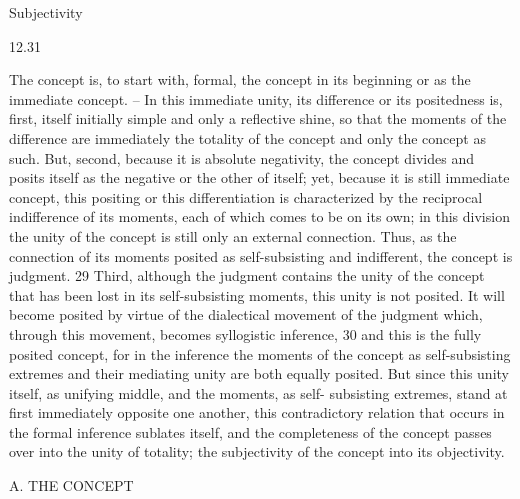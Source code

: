 
Subjectivity

12.31

The concept is, to start with, formal, the concept in its beginning or as
the immediate concept. – In this immediate unity, its difference or its
positedness is, first, itself initially simple and only a reflective shine, so that
the moments of the difference are immediately the totality of the concept
and only the concept as such.
But, second, because it is absolute negativity, the concept divides and
posits itself as the negative or the other of itself; yet, because it is still
immediate concept, this positing or this differentiation is characterized by
the reciprocal indifference of its moments, each of which comes to be on
its own; in this division the unity of the concept is still only an external
connection. Thus, as the connection of its moments posited as self-subsisting
and indifferent, the concept is judgment. 29
Third, although the judgment contains the unity of the concept that
has been lost in its self-subsisting moments, this unity is not posited. It
will become posited by virtue of the dialectical movement of the judgment
which, through this movement, becomes syllogistic inference, 30 and this is
the fully posited concept, for in the inference the moments of the concept
as self-subsisting extremes and their mediating unity are both equally posited.
But since this unity itself, as unifying middle, and the moments, as self-
subsisting extremes, stand at first immediately opposite one another, this
contradictory relation that occurs in the formal inference sublates itself, and
the completeness of the concept passes over into the unity of totality; the
subjectivity of the concept into its objectivity.

A. THE CONCEPT

